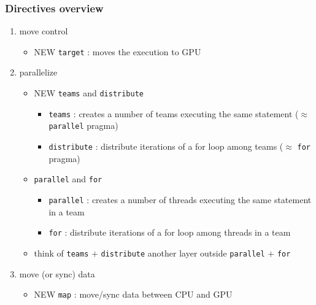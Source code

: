 \documentclass[12pt,dvipdfmx]{beamer}
\newcommand{\ao}[1]{{\color{blue}#1}}
\newcommand{\aka}[1]{{\color{red}#1}}
\begin{document}

\begin{frame}
  \frametitle{Directives overview}
  \begin{enumerate}
  \item move control
    \begin{itemize}
    \item \aka{NEW} \ao{\tt target} : moves the execution to GPU
    \end{itemize}
  \item parallelize
    \begin{itemize}
    \item \aka{NEW} \ao{\tt teams} and \ao{\tt distribute}
      \begin{itemize}
      \item \ao{\tt teams} : creates a number of teams executing the same statement
        ($\approx$ {\tt parallel} pragma)
      \item \ao{\tt distribute} : distribute iterations of a for loop among teams
        ($\approx$ {\tt for} pragma)
      \end{itemize}
    \item \ao{\tt parallel} and \ao{\tt for}
      \begin{itemize}
      \item \ao{\tt parallel} : creates a number of threads
        executing the same statement in a team
      \item \ao{\tt for} : distribute iterations of a for loop among threads
        in a team
      \end{itemize}
    \item think of \ao{\tt teams} $+$ \ao{\tt distribute} another layer
      outside \ao{\tt parallel} $+$ \ao{\tt for}
    \end{itemize}
  \item move (or sync) data
    \begin{itemize}
    \item \aka{NEW} \ao{\tt map} : move/sync data between CPU and GPU
    \end{itemize}
  \end{enumerate}
\end{frame}
\end{document}

